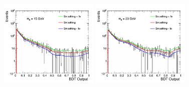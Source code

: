 \begin{figure}[htbp]
\begin{center}
		\includegraphics[width=0.42\textwidth]{figures/chapter04/bkg_smooth/M15_all_DYJetsToLL_SR.png}
		\includegraphics[width=0.42\textwidth]{figures/chapter04/bkg_smooth/M20_all_DYJetsToLL_SR.png}\\
    \label{fig:bkg_smooth2}
\end{center}
\end{figure}

